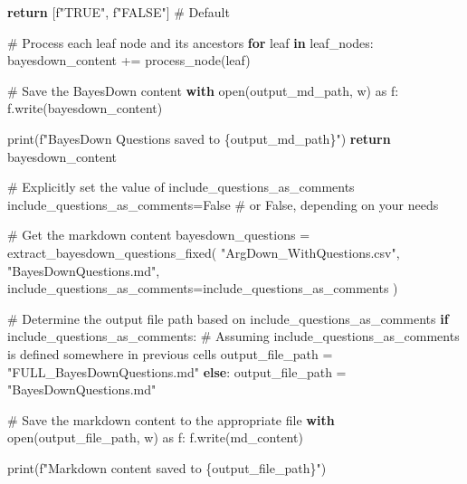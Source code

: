 \documentclass[
  11pt,
  letterpaper,
]{book}
\newenvironment{Shaded}{\begin{snugshade}}{\end{snugshade}}
\newcommand{\BuiltInTok}[1]{\textcolor[rgb]{0.00,0.23,0.31}{#1}}
\newcommand{\CommentTok}[1]{\textcolor[rgb]{0.37,0.37,0.37}{#1}}
\newcommand{\ControlFlowTok}[1]{\textcolor[rgb]{0.00,0.23,0.31}{\textbf{#1}}}
\newcommand{\ImportTok}[1]{\textcolor[rgb]{0.00,0.46,0.62}{#1}}
\newcommand{\KeywordTok}[1]{\textcolor[rgb]{0.00,0.23,0.31}{\textbf{#1}}}
\newcommand{\NormalTok}[1]{\textcolor[rgb]{0.00,0.23,0.31}{#1}}
\newcommand{\OperatorTok}[1]{\textcolor[rgb]{0.37,0.37,0.37}{#1}}
\newcommand{\SpecialCharTok}[1]{\textcolor[rgb]{0.37,0.37,0.37}{#1}}
\newcommand{\SpecialStringTok}[1]{\textcolor[rgb]{0.13,0.47,0.30}{#1}}
\newcommand{\StringTok}[1]{\textcolor[rgb]{0.13,0.47,0.30}{#1}}
\newcommand{\VariableTok}[1]{\textcolor[rgb]{0.07,0.07,0.07}{#1}}
\begin{document}
\begin{Shaded}
\begin{Highlighting}[]
      \ControlFlowTok{return}\NormalTok{ [}\SpecialStringTok{f"TRUE"}\NormalTok{, }\SpecialStringTok{f"FALSE"}\NormalTok{]  }\CommentTok{\# Default}

  \CommentTok{\# Process each leaf node and its ancestors}
  \ControlFlowTok{for}\NormalTok{ leaf }\KeywordTok{in}\NormalTok{ leaf\_nodes:}
\NormalTok{      bayesdown\_content }\OperatorTok{+=}\NormalTok{ process\_node(leaf)}

  \CommentTok{\# Save the BayesDown content}
  \ControlFlowTok{with} \BuiltInTok{open}\NormalTok{(output\_md\_path, }\StringTok{\textquotesingle{}w\textquotesingle{}}\NormalTok{) }\ImportTok{as}\NormalTok{ f:}
\NormalTok{      f.write(bayesdown\_content)}

  \BuiltInTok{print}\NormalTok{(}\SpecialStringTok{f"BayesDown Questions saved to }\SpecialCharTok{\{}\NormalTok{output\_md\_path}\SpecialCharTok{\}}\SpecialStringTok{"}\NormalTok{)}
  \ControlFlowTok{return}\NormalTok{ bayesdown\_content}
\end{Highlighting}
\end{Shaded}

\begin{Shaded}
\begin{Highlighting}[]
\CommentTok{\# Explicitly set the value of include\_questions\_as\_comments}
\NormalTok{include\_questions\_as\_comments}\OperatorTok{=}\VariableTok{False}  \CommentTok{\# or False, depending on your needs}

\CommentTok{\# Get the markdown content}
\NormalTok{bayesdown\_questions }\OperatorTok{=}\NormalTok{ extract\_bayesdown\_questions\_fixed(}
  \StringTok{"ArgDown\_WithQuestions.csv"}\NormalTok{,}
  \StringTok{"BayesDownQuestions.md"}\NormalTok{, include\_questions\_as\_comments}\OperatorTok{=}\NormalTok{include\_questions\_as\_comments}
\NormalTok{)}

\CommentTok{\# Determine the output file path based on include\_questions\_as\_comments}
\ControlFlowTok{if}\NormalTok{ include\_questions\_as\_comments: }\CommentTok{\# Assuming include\_questions\_as\_comments is defined somewhere in previous cells}
\NormalTok{    output\_file\_path }\OperatorTok{=} \StringTok{"FULL\_BayesDownQuestions.md"}
\ControlFlowTok{else}\NormalTok{:}
\NormalTok{    output\_file\_path }\OperatorTok{=} \StringTok{"BayesDownQuestions.md"}

\CommentTok{\# Save the markdown content to the appropriate file}
\ControlFlowTok{with} \BuiltInTok{open}\NormalTok{(output\_file\_path, }\StringTok{\textquotesingle{}w\textquotesingle{}}\NormalTok{) }\ImportTok{as}\NormalTok{ f:}
\NormalTok{    f.write(md\_content)}

\BuiltInTok{print}\NormalTok{(}\SpecialStringTok{f"Markdown content saved to }\SpecialCharTok{\{}\NormalTok{output\_file\_path}\SpecialCharTok{\}}\SpecialStringTok{"}\NormalTok{)}
\end{Highlighting}
\end{Shaded}
\end{document}
